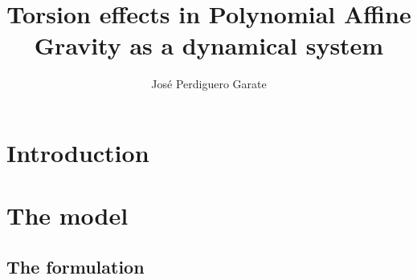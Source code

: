 \documentclass{article}
\title{Torsion effects in Polynomial Affine Gravity as a dynamical system}
\author{Jos\'e Perdiguero Garate}
\begin{document}
\maketitle

\section{Introduction}

\section{The model}


\subsection{The formulation}
\end{document}
